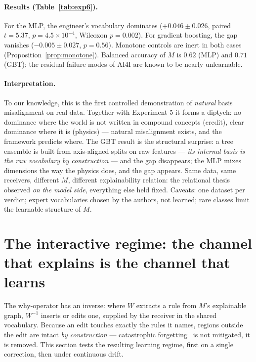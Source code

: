 \documentclass[10pt]{article}
\theoremstyle{definition}
\theoremstyle{plain}
\begin{document}
\paragraph{Results (Table~\ref{tab:exp6}).} For the MLP, the engineer's vocabulary dominates ($+0.046 \pm 0.026$, paired $t = 5.37$, $p = 4.5{\times}10^{-4}$, Wilcoxon $p = 0.002$). For gradient boosting, the gap vanishes ($-0.005 \pm 0.027$, $p = 0.56$). Monotone controls are inert in both cases (Proposition~\ref{prop:monotone}). Balanced accuracy of $M$ is $0.62$ (MLP) and $0.71$ (GBT); the residual failure modes of AI4I are known to be nearly unlearnable.

\paragraph{Interpretation.} To our knowledge, this is the first controlled demonstration of \emph{natural} basis misalignment on real data. Together with Experiment 5 it forms a diptych: no dominance where the world is not written in compound concepts (credit), clear dominance where it is (physics) --- natural misalignment exists, and the framework predicts where. The GBT result is the structural surprise: a tree ensemble is built from axis-aligned splits on raw features --- \emph{its internal basis is the raw vocabulary by construction} --- and the gap disappears; the MLP mixes dimensions the way the physics does, and the gap appears. Same data, same receivers, different $M$, different explainability relation: the relational thesis observed \emph{on the model side}, everything else held fixed. Caveats: one dataset per verdict; expert vocabularies chosen by the authors, not learned; rare classes limit the learnable structure of $M$.

\section{The interactive regime: the channel that explains is the channel that learns}
\label{sec:interactive}

The why-operator has an inverse: where $W$ extracts a rule from $M$'s explainable graph, $W^{-1}$ inserts or edits one, supplied by the receiver in the shared vocabulary. Because an edit touches exactly the rules it names, regions outside the edit are intact \emph{by construction} --- catastrophic forgetting~\citep{mccloskey1989catastrophic,french1999catastrophic} is not mitigated, it is removed. This section tests the resulting learning regime, first on a single correction, then under continuous drift.
\end{document}
